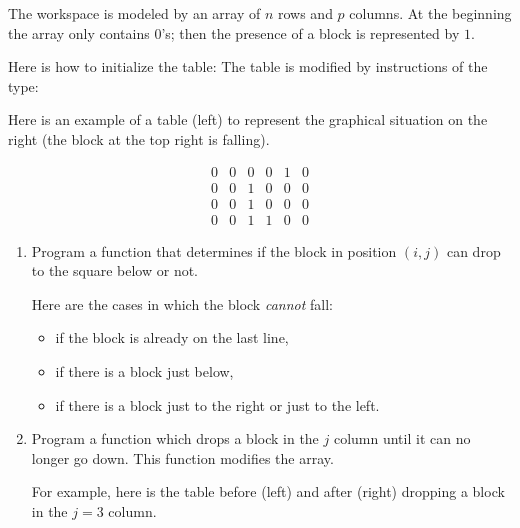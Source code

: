 \documentclass[11pt,class=report,crop=false]{standalone}
\begin{document}
\begin{activite}


The workspace is modeled by an array of $n$ rows and $p$ columns. At the beginning the array only contains $0$'s;
 then the presence of a block is represented by $1$.

Here is how to initialize the table:
The table is modified by instructions of the type:


Here is an example of a table (left) to represent the graphical situation on the right (the block at the top right is falling).

\begin{center}
\begin{minipage}{0.3\textwidth}
$$\begin{array}{cccccc}
0&0&0&0&1&0\\
0&0&1&0&0&0\\
0&0&1&0&0&0\\
0&0&1&1&0&0
\end{array}$$
\end{minipage}
\begin{minipage}{0.4\textwidth}
\end{minipage}
\end{center}

\begin{enumerate}
  \item Program a  function that determines if the block in position $(i,j)$ can drop to the square below or not.
  
  Here are the cases in which the block \emph{cannot} fall:
  \begin{itemize}
    \item if the block is already on the last line,
    \item if there is a block just below,
    \item if there is a block just to the right or just to the left.
  \end{itemize}
  
  \item Program a  function
which drops a block in the $j$ column until it can no longer go down.
This function modifies the array.  
  
  For example, here is the table before (left) and after (right) dropping a block in the $j=3$ column.  
  

\end{enumerate}
\end{activite}
\end{document}
